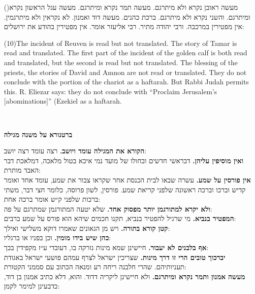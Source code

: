 \documentclass[12pt, openany]{book}
\renewcommand{\partname}[1]{}
\newcommand{\sethebfont}{
\fontsize{10.5pt}{13.1pt} \selectfont
}
\newcommand{\setengfont}{
\fontsize{14pt}{17.5pt} \selectfont
}
\newcommand{\LTRmark}{‎}
\newcommand{\hebeng}[2]{
	{\sethebfont #1}
	
	{\beginL\englishfont\sethebfont{\raggedright #2 \hfill} \LTRmark\endL}
	
	\vspace{\baselineskip}
}
\newcommand{\chapname}{}
\newcommand{\sectname}{}
\newcommand{\newsection}[1]{
	\renewcommand{\sectname}{#1}	
	\vspace{-\baselineskip}
	\begin{center}
		\textbf{%
\fontsize{16pt}{16pt}\selectfont
			#1}
	\end{center}
	\vspace{-\baselineskip}
	\nopagebreak
}
\newcommand{\blockcomment}[2]{ 
\vspace{\baselineskip}
\newsection{#1}
\sethebfont	\textsf{#2}
\vspace{\baselineskip}}
\newcommand{\vsnum}[1]{(\hebrewnumeral{#1})\space}
\newcommand{\vsnumeng}[1]{(#1)\space}
\begin{document}
\hebeng{\vsnum{10}מעשה ראובן נקרא ולא מיתרגם. מעשה תמר נקרא ומיתרגם. מעשה עגל הראשון נקרא ומיתרגם. והשני נקרא ולא מיתרגם. ברכת כהנים. מעשה דוד ואמנון. לא נקראין ולא מיתרגמין. אין מפטירין במרכבה. ורבי יהודה מתיר. רבי אליעזר אומר. אין מפטירין בהודע את ירושלים:  }{\vsnumeng{10}The incident of Reuven is read but not translated. The story of Tamar is read and translated. The first part of the incident of the golden calf is both read and translated, but the second is read but not translated. The blessing of the priests, the stories of David and Amnon are not read or translated. They do not conclude with the portion of the chariot as a haftarah. But Rabbi Judah permits this. R. Eliezar says: they do not conclude with “Proclaim Jerusalem’s {[abominations]}” (Ezekiel as a haftarah.}%

\blockcomment{ברטנורא על משנה מגילה}{\textrm{\textbf{הקורא את המגילה עומד ויושב.}} רצה עומד רצה יושב:\\\textrm{\textbf{ואין מוסיפין עליהן.}} דבראשי חדשים ובחולו של מועד נמי איכא בטול מלאכה, דמלאכת דבר האבד מותרת:\\\textrm{\textbf{אין פורסין על שמע.}} עשרה שבאו לבית הכנסת אחר שקראו צבור את שמע, עומד אחד ואומר קדיש וברכו וברכה ראשונה שלפני קריאת שמע. פורסין, לשון פרוסה, כלומר חצי דבר, משתי ברכות שלפני ק״ש אומר ברכה אחת:\\\textrm{\textbf{ולא יקרא למתורגמן יותר מפסוק אחד.}} שלא יטעה המתורגמן שמתרגם על פה:\\\textrm{\textbf{המפטיר בנביא.}} מי שרגיל להפטיר בנביא, תקנו חכמים שיהא הוא פורס על שמע ברבים:\\\textrm{\textbf{קטן קורא בתורה.}} ויש מן הגאונים שאמרו דוקא משלישי ואילך:\\\textrm{\textbf{כהן שיש בידו מומין.}} וכן בפניו או ברגליו:\\\textrm{\textbf{אף בלבנים לא יעבור.}} חיישינן שמא מינות נזרקה בו, דעובדי ע״ז מקפידין בכך:\\\textrm{\textbf{יברכוך טובים הרי זו דרך מינות.}} שצריכין ישראל לצרף עמהם פושעי ישראל באגודת תעניותיהם. שהרי חלבנה ריחה רע ומנאה הכתוב עם סממני הקטורת:\\\textrm{\textbf{מעשה אמנון ותמר נקרא ומיתרגם.}} ולא חיישינן ליקריה דדוד. והוא, דלא כתיב אמנון בן דוד, כדבעינן למימר לקמן:\\\n}%
{}\renewcommand{\partname}[1]{בן יהוידע על מגילה}
\fancyhead[CO]{ \partname\space\textendash\space \chapname}
\fancyhead[CE]{\partname}
\renewcommand{\sethebfont}{\fontsize{10.5pt}{13.1pt} \selectfont}\sethebfont
\renewcommand{\setengfont}{\fontsize{14pt}{13.1pt} \selectfont}\setengfont
\end{document}
